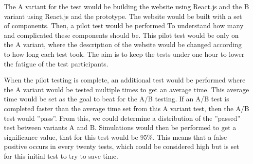 The A variant for the test would be building the website using React.js and the B variant using React.js and the prototype. The website would be built with a set of components. Then, a pilot test would be performed To understand how many and complicated these components should be.  This pilot test would be only on the A variant, where the description of the website would be changed according to how long each test took. The aim is to keep the tests under one hour to lower the fatigue of the test participants.

When the pilot testing is complete, an additional test would be performed where the A variant would be tested multiple times to get an average time. This average time would be set as the goal to beat for the A/B testing. If an A/B test is completed faster than the average time set from this A variant test, then the A/B test would ''pass''.  From this, we could determine a distribution of the ''passed'' test between variants A and B. Simulations would then be performed to get a significance value, that for this test would be 95\%. This means that a false positive occurs in every twenty tests, which could be considered high but is set for this initial test to try to save time.
